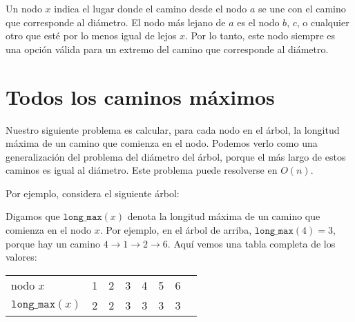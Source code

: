Un nodo $x$ indica el lugar donde el camino desde el nodo $a$
se une con el camino que corresponde al diámetro. El nodo más
lejano de $a$ es el nodo $b$, $c$, o cualquier otro que esté
por lo menos igual de lejos $x$. Por lo tanto,
este nodo siempre es una opción válida para un extremo del
camino que corresponde al diámetro.

\section{Todos los caminos máximos}

Nuestro siguiente problema es calcular, para cada nodo en el árbol,
la longitud máxima de un camino que comienza en el nodo. Podemos verlo
como una generalización del problema del diámetro del árbol,
porque el más largo de estos caminos es igual al diámetro.
Este problema puede resolverse en $O(n)$.

Por ejemplo, considera el siguiente árbol:
\begin{center}
\end{center}

Digamos que $\texttt{long\_max}(x)$ denota la longitud máxima
de un camino que comienza en el nodo $x$. Por ejemplo, en el
árbol de arriba, $\texttt{long\_max}(4)=3$, porque hay un camino
$4 \rightarrow 1 \rightarrow 2 \rightarrow 6$. Aquí vemos una
tabla completa de los valores:
\begin{center}
    \begin{tabular}{l|lllllll}
        nodo $x$                & 1 & 2 & 3 & 4 & 5 & 6 \\
        $\texttt{long\_max}(x)$ & 2 & 2 & 3 & 3 & 3 & 3 \\
    \end{tabular}
\end{center}


